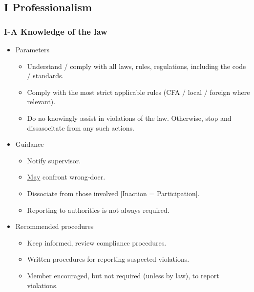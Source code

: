 \documentclass[../notes_compiled.tex]{subfiles}
\begin{document}
\subsection{I Professionalism}
\subsubsection{I-A Knowledge of the law}
\begin{itemize}
\item Parameters
\begin{itemize}
\item Understand / comply with all laws, rules, regulations, including the code / standards.
\item Comply with the most strict applicable rules (CFA / local / foreign where relevant).
\item Do no knowingly assist in violations of the law. Otherwise, stop and dissasocitate from any such actions.
\end{itemize}
\item Guidance
\begin{itemize}
\item Notify supervisor.
\item \underline{May} confront wrong-doer.
\item Dissociate from those involved [Inaction = Participation].
\item Reporting to authorities is not always required.
\end{itemize}
\item Recommended procedures
\begin{itemize}
\item Keep informed, review compliance procedures.
\item Written procedures for reporting suspected violations.
\item Member encouraged, but not required (unless by law), to report violations.
\end{itemize}
\end{itemize}
\end{document}
